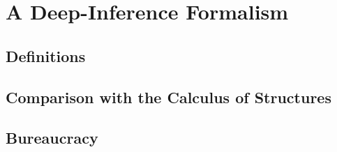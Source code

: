 \chapter{A Deep-Inference Formalism}
\section{Definitions}
\section{Comparison with the Calculus of Structures}
\section{Bureaucracy}